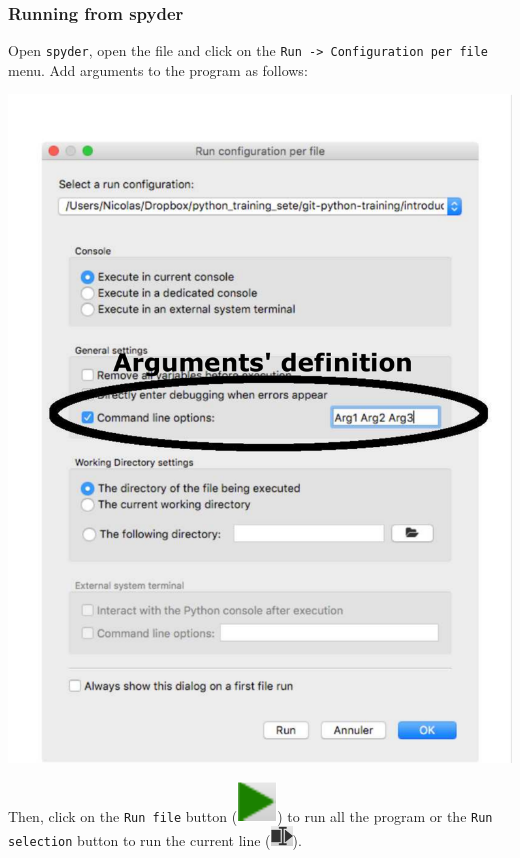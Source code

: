 \begin{frame}[fragile]
    \frametitle{Running from spyder}
    Open \verb+spyder+, open the file and click on the \scriptsize \verb+Run -> Configuration per file+ \normalsize menu. Add arguments to the program as follows:\\
    \vspace{-0.5em}
    \begin{center}
    \includegraphics[scale=0.35, trim={0cm 0cm 0cm 0cm}, clip=true]{figs/args_spyder.pdf}
    \end{center}
    Then, click on the \verb+Run file+ button (\includegraphics[scale=0.5]{figs/run_file.pdf}) to run all the program or the \verb+Run selection+ button
    to run the current line (\includegraphics[scale=0.5]{figs/run_sel.png}).
\end{frame}
